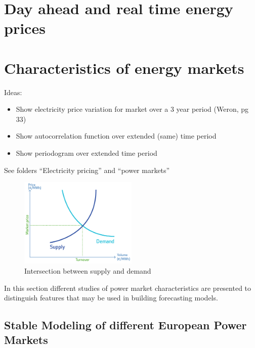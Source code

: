 



\section{Day ahead and real time energy prices}




\section{Characteristics of energy markets}

Ideas: 

\begin{itemize}
	\item Show electricity price variation for market over a 3 year period (Weron, pg 33)
	\item Show autocorrelation function over extended (same) time period
	\item Show periodogram over extended time period
\end{itemize}




See folders "`Electricity pricing"' and "`power markets"'


\begin{figure}[htbp]
	\centering
		\includegraphics[width=0.5\textwidth]{figures/data_analysis/DA_supply_demand.png}
	\caption{Intersection between supply and demand \cite{nord2014supply}}
	\label{fig:DA_supply_demand}
\end{figure}



In this section different studies of power market characteristics are presented to distinguish features that may be used in building forecasting models. 

\subsection{Stable Modeling of different European Power Markets}

